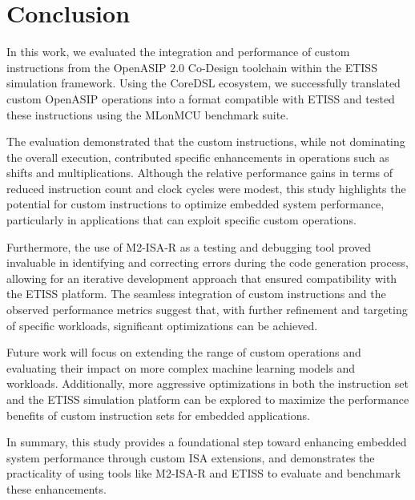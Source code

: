 \section{Conclusion}

In this work, we evaluated the integration and performance of custom instructions from the OpenASIP 2.0 Co-Design toolchain within the ETISS simulation framework. Using the CoreDSL ecosystem, we successfully translated custom OpenASIP operations into a format compatible with ETISS and tested these instructions using the MLonMCU benchmark suite.

The evaluation demonstrated that the custom instructions, while not dominating the overall execution, contributed specific enhancements in operations such as shifts and multiplications. Although the relative performance gains in terms of reduced instruction count and clock cycles were modest, this study highlights the potential for custom instructions to optimize embedded system performance, particularly in applications that can exploit specific custom operations.

Furthermore, the use of M2-ISA-R as a testing and debugging tool proved invaluable in identifying and correcting errors during the code generation process, allowing for an iterative development approach that ensured compatibility with the ETISS platform. The seamless integration of custom instructions and the observed performance metrics suggest that, with further refinement and targeting of specific workloads, significant optimizations can be achieved.

Future work will focus on extending the range of custom operations and evaluating their impact on more complex machine learning models and workloads. Additionally, more aggressive optimizations in both the instruction set and the ETISS simulation platform can be explored to maximize the performance benefits of custom instruction sets for embedded applications.

In summary, this study provides a foundational step toward enhancing embedded system performance through custom ISA extensions, and demonstrates the practicality of using tools like M2-ISA-R and ETISS to evaluate and benchmark these enhancements.